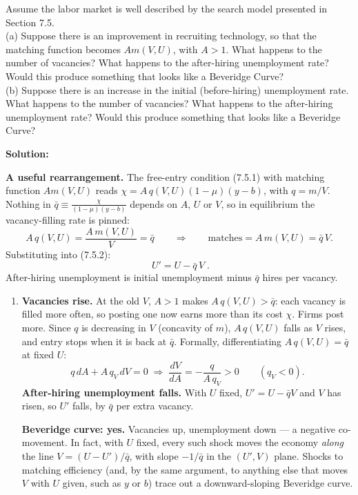 \documentclass[12pt, letterpaper]{article}
\newcommand{\dd}[2]{\dfrac{d #1}{d #2}}
\begin{document}
\begin{tcolorbox}[oddbox,title={Problem 7.7 \quad The Beveridge Curve}]
\begin{tcolorbox}[questionbox]
Assume the labor market is well described by the search model presented in Section 7.5.\\[3pt]
(a) Suppose there is an improvement in recruiting technology, so that the matching function
becomes $Am(V,U)$, with $A>1$. What happens to the number of vacancies? What happens to the
after-hiring unemployment rate? Would this produce something that looks like a Beveridge
Curve?\\
(b) Suppose there is an increase in the initial (before-hiring) unemployment rate. What
happens to the number of vacancies? What happens to the after-hiring unemployment rate? Would
this produce something that looks like a Beveridge Curve?
\end{tcolorbox}

\textbf{Solution:}

\textbf{A useful rearrangement.} The free-entry condition (7.5.1) with matching function
$Am(V,U)$ reads $\chi=A\,q(V,U)(1-\mu)(y-b)$, with $q=m/V$. Nothing in
$\bar q\equiv\frac{\chi}{(1-\mu)(y-b)}$ depends on $A$, $U$ or $V$, so in equilibrium the
vacancy-filling rate is pinned:
\[
A\,q(V,U)=\frac{A\,m(V,U)}{V}=\bar q
\qquad\Longrightarrow\qquad
\text{matches}=A\,m(V,U)=\bar q\,V .
\]
Substituting into (7.5.2):
\[
\boxed{\;U'=U-\bar q\,V\;}.
\]
After-hiring unemployment is initial unemployment minus $\bar q$ hires per vacancy.

\begin{enumerate}
\item \textbf{Vacancies rise.} At the old $V$, $A>1$ makes $A\,q(V,U)>\bar q$: each vacancy
is filled more often, so posting one now earns more than its cost $\chi$. Firms post more.
Since $q$ is decreasing in $V$ (concavity of $m$), $A\,q(V,U)$ falls as $V$ rises, and entry
stops when it is back at $\bar q$. Formally, differentiating $A\,q(V,U)=\bar q$ at fixed $U$:
\[
q\,dA+A\,q_V\,dV=0\;\Longrightarrow\;\dd{V}{A}=-\frac{q}{A\,q_V}>0\qquad(q_V<0).
\]
\textbf{After-hiring unemployment falls.} With $U$ fixed, $U'=U-\bar q V$ and $V$ has risen,
so $U'$ falls, by $\bar q$ per extra vacancy.

\textbf{Beveridge curve: yes.} Vacancies up, unemployment down --- a negative co-movement. In
fact, with $U$ fixed, every such shock moves the economy \emph{along} the line
$V=(U-U')/\bar q$, with slope $-1/\bar q$ in the $(U',V)$ plane. Shocks to matching efficiency
(and, by the same argument, to anything else that moves $V$ with $U$ given, such as $y$ or
$b$) trace out a downward-sloping Beveridge curve.


\end{enumerate}
\end{tcolorbox}
\end{document}
